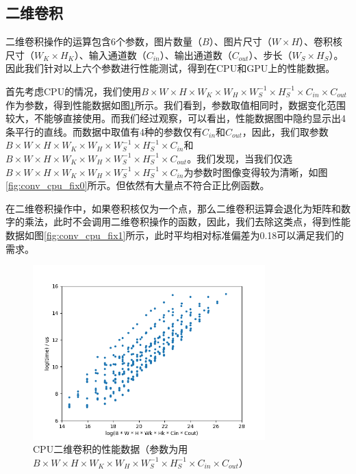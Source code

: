\subsection{二维卷积}
\label{ssec:impl_conv}
    二维卷积操作的运算包含6个参数，图片数量（$ B $）、图片尺寸（$ W \times H $）、卷积核尺寸（$ W_K \times H_K $）、输入通道数（$ C_{in} $）、输出通道数（$ C_{out} $）、步长（$ W_S \times H_S $）。因此我们针对以上六个参数进行性能测试，得到在CPU和GPU上的性能数据。

    首先考虑CPU的情况，我们使用$ B \times W \times H \times W_K \times W_H \times W_S^{-1} \times H_S^{-1} \times C_{in} \times C_{out} $作为参数，得到性能数据如图\ref{fig:conv_cpu}所示。我们看到，参数取值相同时，数据变化范围较大，不能够直接使用。而我们经过观察，可以看出，性能数据图中隐约显示出4条平行的直线。而数据中取值有4种的参数仅有$ C_{in} $和$ C_{out} $，因此，我们取参数$ B \times W \times H \times W_K \times W_H \times W_S^{-1} \times H_S^{-1} \times C_{in} $和$ B \times W \times H \times W_K \times W_H \times W_S^{-1} \times H_S^{-1} \times C_{out} $。我们发现，当我们仅选$ B \times W \times H \times W_K \times W_H \times W_S^{-1} \times H_S^{-1} \times C_{in}  $为参数时图像变得较为清晰，如图\ref{fig:conv_cpu_fix0}所示。但依然有大量点不符合正比例函数。
    
    在二维卷积操作中，如果卷积核仅为一个点，那么二维卷积运算会退化为矩阵和数字的乘法，此时不会调用二维卷积操作的函数，因此，我们去除这类点，得到性能数据如图\ref{fig:conv_cpu_fix1}所示，此时平均相对标准偏差为0.18可以满足我们的需求。

    \begin{figure}[!htbp]
        \centering
        \includegraphics[width=0.8\textwidth]{figures/conv_cpu.png}
        \caption{CPU二维卷积的性能数据（参数为用$ B \times W \times H \times W_K \times W_H \times W_S^{-1} \times H_S^{-1} \times C_{in} \times C_{out} $）}
        \label{fig:conv_cpu}
    \end{figure}

